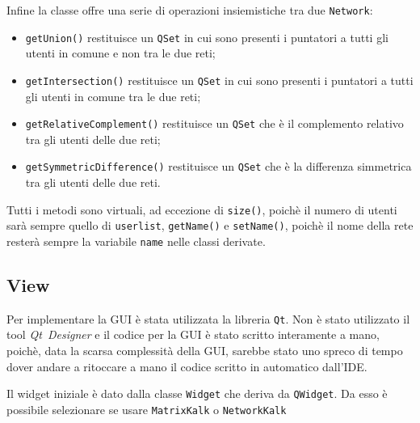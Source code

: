 Infine la classe offre una serie di operazioni insiemistiche tra due \texttt{Network}: 
\begin{itemize}[noitemsep]
    \item \texttt{getUnion()} restituisce un \texttt{QSet} in cui sono presenti i puntatori a tutti gli utenti
    in comune e non tra le due reti;
    \item \texttt{getIntersection()} restituisce un \texttt{QSet} in cui sono presenti i puntatori a tutti gli 
    utenti in comune tra le due reti;
    \item \texttt{getRelativeComplement()} restituisce un \texttt{QSet} che è il complemento relativo tra gli utenti 
    delle due reti;
    \item \texttt{getSymmetricDifference()} restituisce un \texttt{QSet} che è la differenza simmetrica tra gli utenti
    delle due reti.
\end{itemize}

Tutti i metodi sono virtuali, ad eccezione di \texttt{size()}, poichè il numero di utenti sarà sempre quello di 
\texttt{userlist}, \texttt{getName()} e \texttt{setName()}, poichè il nome della rete resterà sempre la variabile
\texttt{name} nelle classi derivate.
 
\subsection{View}

Per implementare la GUI è stata utilizzata la libreria \texttt{Qt}. Non è stato utilizzato il tool \mbox{\emph{Qt Designer}} e il codice per la GUI è stato scritto
interamente a mano, poichè, data la scarsa complessità della GUI, sarebbe stato uno spreco di tempo dover andare a ritoccare a mano
il codice scritto in automatico dall'IDE.\par
Il widget iniziale è dato dalla classe 
\texttt{Widget} che deriva da \texttt{QWidget}. Da esso è possibile selezionare se usare \texttt{MatrixKalk} 
o \texttt{NetworkKalk}

